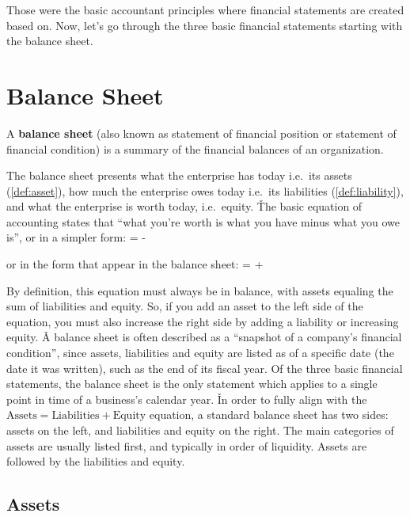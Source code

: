Those were the basic accountant principles where financial statements are created based on. Now, let's go through the
three basic financial statements starting with the balance sheet.

\section{Balance Sheet}

A \textbf{balance sheet} (also known as statement of financial position or statement of financial condition) is a
summary of the financial balances of an organization.
\ed

The balance sheet presents what the enterprise has today i.e.\ its assets (\ref{def:asset}), how much the enterprise
owes today i.e.\ its liabilities (\ref{def:liability}), and what the enterprise is worth today, i.e.\ equity. \v

The basic equation of accounting states that ``what you're worth is what you have minus what you owe is'', or in a
simpler form:
\bse
{} =  - 
\ese

or in the form that appear in the balance sheet:
\bse
{} =  + 
\ese

By definition, this equation must always be in balance, with assets equaling the sum of liabilities and equity. So, if
you add an asset to the left side of the equation, you must also increase the right side by adding a liability or
increasing equity. \v

A balance sheet is often described as a ``snapshot of a company's financial condition'', since assets, liabilities
and equity are listed as of a specific date (the date it was written), such as the end of its fiscal year. Of the
three basic financial statements, the balance sheet is the only statement which applies to a single point in time of a
business's calendar year. \v

In order to fully align with the $\text{Assets} = \text{Liabilities} + \text{Equity}$ equation, a standard balance
sheet has two sides: assets on the left, and liabilities and equity on the right. The main categories of assets are
usually listed first, and typically in order of liquidity. Assets are followed by the liabilities and equity.

\subsection{Assets}

